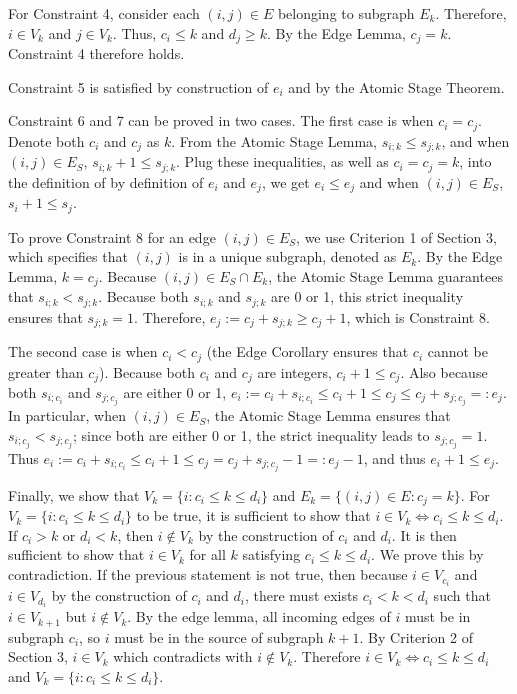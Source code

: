 \documentclass[review]{siamart0216}
\begin{document}
For Constraint 4, consider each $(i,j)\in E$ belonging to
subgraph $E_k$.  Therefore, $i\in V_k$ and $j\in V_k$.
Thus, $c_i\le k$ and $d_j\ge k$.  By the Edge Lemma, $c_j=k$.
Constraint 4 therefore holds.

Constraint 5 is satisfied by construction of $e_i$ and by the Atomic Stage
Theorem.

Constraint 6 and 7 can be proved in two cases.
The first case is when $c_i=c_j$.  Denote both $c_i$ and $c_j$ as $k$.
From the Atomic Stage Lemma,
$s_{i;k} \le s_{j;k}$, and when $(i,j)\in E_S$, $s_{i;k}+1 \le s_{j;k}$.
Plug these inequalities, as well as $c_i=c_j=k$, into the definition
of by definition of $e_i$ and $e_j$, we get
$e_i \le e_j$ and when $(i,j)\in E_S$, $s_i+1 \le s_j$.

To prove Constraint 8 for an edge $(i,j)\in E_S$, we use Criterion 1 of
Section 3, which specifies that $(i,j)$ is in a unique subgraph, denoted
as $E_k$.  By the Edge Lemma, $k=c_j$.  Because $(i,j)\in E_S\cap E_k$,
the Atomic Stage Lemma guarantees that $s_{i;k} < s_{j;k}$.  Because both
$s_{i;k}$ and $s_{j;k}$ are 0 or 1, this strict inequality ensures
that $s_{j;k}=1$.  Therefore, $e_j:= c_j + s_{j;k} \ge c_j+1$, which is
Constraint 8.

The second case is when $c_i<c_j$ (the Edge Corollary ensures that $c_i$
cannot be greater than $c_j$).  Because both $c_i$ and $c_j$
are integers, $c_i+1\le c_j$.  Also because both $s_{i;c_i}$ and $s_{j;c_j}$
are either 0 or 1,
$e_i := c_i+s_{i;c_i}\le c_i+1 \le c_j \le c_j+s_{j;c_j}=:e_j$.
In particular, when $(i,j)\in E_S$, the Atomic Stage Lemma ensures that
$s_{i;c_j} < s_{j;c_j}$; since both are either 0 or 1, the strict inequality
leads to $s_{j;c_j}=1$.  Thus
$e_i := c_i+s_{i;c_i}\le c_i+1 \le c_j = c_j+s_{j;c_j}-1=:e_j-1$, and thus
$e_i+1\le e_j$.

Finally, we show that $V_k=\{i : c_i\le k\le d_i\}$ and
$E_k=\{(i,j)\in E : c_j=k\}$.  For $V_k=\{i : c_i\le k\le d_i\}$ to be
true, it is sufficient to show that $i\in V_k\Leftrightarrow c_i\le k\le d_i$.
If $c_i>k$ or $d_i<k$, then $i\notin V_k$
by the construction of $c_i$ and $d_i$.  It is then sufficient to
show that $i\in V_k$ for all $k$ satisfying $c_i\le k\le d_i$.  We prove
this by contradiction.  If the previous statement is not true, then
because $i\in V_{c_i}$ and $i\in V_{d_i}$ by the construction of $c_i$
and $d_i$, there must exists $c_i < k < d_i$ such that
$i\in V_{k+1}$ but $i\notin V_k$.  By the edge lemma, all incoming edges
of $i$ must be in subgraph $c_i$, so $i$ must be in the source of subgraph
$k+1$.  By Criterion 2 of Section 3, $i\in V_k$ which contradicts with
$i\notin V_k$.  Therefore $i\in V_k\Leftrightarrow c_i\le k\le d_i$ and
$V_k=\{i : c_i\le k\le d_i\}$.
\end{document}
